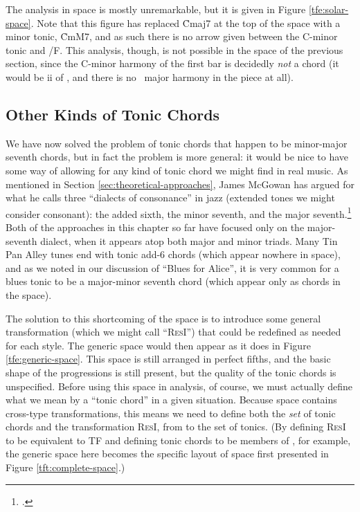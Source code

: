 The analysis in \tf space is mostly unremarkable, but it is given in Figure
\ref{tfe:solar-space}. Note that this figure has replaced \h{Cmaj7} at the top
of the space with a minor tonic, \h{CmM7}, and as such there is no arrow given
between the C-minor tonic and \V/F. This analysis, though, is not
possible in the \tf space of the previous section, since the C-minor harmony
of the first bar is decidedly \emph{not} a \ii chord (it would be ii of
\Bflat, and there is no \Bflat\ major harmony in the piece at all).



\FloatBarrier
\subsection{Other Kinds of Tonic Chords}
\label{sec:other-kinds-tonic}

We have now solved the problem of tonic chords that happen to be minor-major
seventh chords, but in fact the problem is more general: it would be nice to
have some way of allowing for any kind of tonic chord we might find in real
music. As mentioned in Section \ref{sec:theoretical-approaches}, James McGowan
has argued for what he calls three ``dialects of consonance'' in jazz
(extended tones we might consider consonant): the added sixth, the minor
seventh, and the major seventh.\footcite[76--79]{mcgowan:2005} Both of the
approaches in this chapter so far have focused only on the major-seventh
dialect, when it appears atop both major and minor triads. Many Tin Pan Alley
tunes end with tonic add-6 chords (which appear nowhere in \tf space), and as
we noted in our discussion of ``Blues for Alice'', it is very common for a
blues tonic to be a major-minor seventh chord (which appear only as \V chords
in the space).

The solution to this shortcoming of the space is to introduce some general
transformation (which we might call ``\textsc{ResI}'') that could be redefined
as needed for each style. The generic space would then appear as it
does in Figure \ref{tfe:generic-space}. This space is still arranged in
perfect fifths, and the basic shape of the \tfo progressions is still present,
but the quality of the tonic chords is unspecified. Before using this space in
analysis, of course, we must actually define what we mean by a ``tonic chord''
in a given situation. Because \tf space contains cross-type transformations,
this means we need to define both the \emph{set} of tonic chords and the
transformation \textsc{ResI}, from \Sdom to the set of tonics. (By defining
\textsc{ResI} to be equivalent to TF and defining tonic chords to be members
of \Smaj, for example, the generic space here becomes the specific layout of
\tf space first presented in Figure \ref{tft:complete-space}.)

